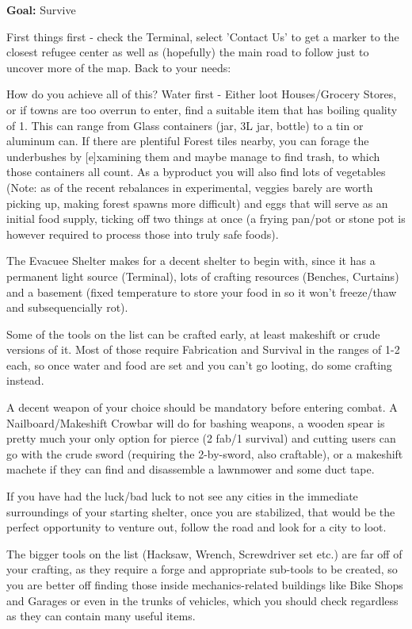 \textbf{Goal:} Survive

First things first - check the Terminal, select 'Contact Us' to get a marker to the closest refugee center as well as (hopefully) the main road to follow just to uncover more of the map. Back to your needs:

How do you achieve all of this? Water first - Either loot Houses/Grocery Stores, or if towns are too overrun to enter, find a suitable item that has boiling quality of 1. This can range from Glass containers (jar, 3L jar, bottle) to a tin or aluminum can. If there are plentiful Forest tiles nearby, you can forage the underbushes by [e]xamining them and maybe manage to find trash, to which those containers all count. As a byproduct you will also find lots of vegetables (Note: as of the recent rebalances in experimental, veggies barely are worth picking up, making forest spawns more difficult) and eggs that will serve as an initial food supply, ticking off two things at once (a frying pan/pot or stone pot is however required to process those into truly safe foods).

The Evacuee Shelter makes for a decent shelter to begin with, since it has a permanent light source (Terminal), lots of crafting resources (Benches, Curtains) and a basement (fixed temperature to store your food in so it won't freeze/thaw and subsequencially rot).

Some of the tools on the list can be crafted early, at least makeshift or crude versions of it. Most of those require Fabrication and Survival in the ranges of 1-2 each, so once water and food are set and you can't go looting, do some crafting instead.

A decent weapon of your choice should be mandatory before entering combat. A Nailboard/Makeshift Crowbar will do for bashing weapons, a wooden spear is pretty much your only option for pierce (2 fab/1 survival) and cutting users can go with the crude sword (requiring the 2-by-sword, also craftable), or a makeshift machete if they can find and disassemble a lawnmower and some duct tape.

If you have had the luck/bad luck to not see any cities in the immediate surroundings of your starting shelter, once you are stabilized, that would be the perfect opportunity to venture out, follow the road and look for a city to loot.

The bigger tools on the list (Hacksaw, Wrench, Screwdriver set etc.) are far off of your crafting, as they require a forge and appropriate sub-tools to be created, so you are better off finding those inside mechanics-related buildings like Bike Shops and Garages or even in the trunks of vehicles, which you should check regardless as they can contain many useful items.

